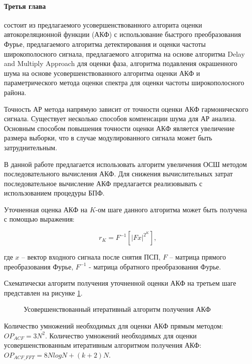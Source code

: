 \paragraph{Третья глава} состоит из предлагаемого усовершенствованного алгорита оценки автокореляционной функции (АКФ) с использование
быстрого преобразования Фурье, предлагаемого алгоритма детектирования и оценки частоты широкополосного сигнала,
предлагаемого алгоритма на основе алгоритма Delay and Multiply Approach для оценки фаза, алгоритма подавления
окрашенного шума на основе усовершенствованного алгоритма оценки АКФ и параметрического метода оценки спектра
для оценки частоты широкополосного района.

Точность АР метода напрямую зависит от точности оценки АКФ гармонического сигнала.
Существует несколько способов компенсации шума для АР анализа.
Основным способом повышения точности оценки АКФ является увеличение размера выборки, что в случае модулированного сигнала может быть затруднительным. 

В данной работе предлагается использовать алгоритм увеличения ОСШ методом последовательного вычисления АКФ.
Для снижения вычислительных затрат последовательное вычисление АКФ предлагается реализовывать с использованием процедуры БПФ. 

Уточненная оценка АКФ на ${K}$-ом шаге данного алгоритма может быть получена с помощью выражения:
\begin{center}
\begin{equation}
	\label{eq:akf_3}
	\hat{r}_K = F^{-1}\left[ \left| Fx \right| ^{2^K} \right],
\end{equation}
\end{center}
где ${x}$ – вектор входного сигнала после снятия ПСП, ${F}$ – матрица прямого преобразования Фурье,
${F^{-1}}$ - матрица обратного преобразования Фурье.

Схематически алгоритм получения уточненной оценки АКФ на третьем шаге представлен на рисунке \ref{pic:akf_pic}.
\begin{figure}[H]
	\center{}
	\caption{Усовершенствованный итеративный алгоритм получения АКФ}
	\label{pic:akf_pic}
\end{figure}

Количество умножений необходимых для оценки АКФ прямым методом: ${OP_{ACF} = 3N^2}$. Количество умножений необходимых для оценки
усовершенствованным итеративным алгоритмом получения АКФ: ${OP_{ACF\_FFT} = 8NlogN + (k+2)N}$.

